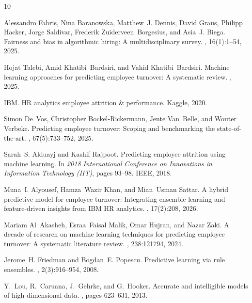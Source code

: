 \documentclass[twocolumn]{article}
\begin{document}
\begin{thebibliography}{10}

Alessandro Fabris, Nina Baranowska, Matthew~J. Dennis, David Graus, Philipp
  Hacker, Jorge Saldivar, Frederik Zuiderveen~Borgesius, and Asia~J. Biega.
\newblock Fairness and bias in algorithmic hiring: A multidisciplinary survey.
,
  16(1):1--54, 2025.

Hojat Talebi, Amid Khatibi~Bardsiri, and Vahid Khatibi~Bardsiri.
\newblock Machine learning approaches for predicting employee turnover: A
  systematic review.
, 2025.

{IBM}.
 {HR} analytics employee attrition \& performance.
\newblock Kaggle, 2020.

Simon De~Vos, Christopher Bockel-Rickermann, Jente Van~Belle, and Wouter
  Verbeke.
\newblock Predicting employee turnover: Scoping and benchmarking the
  state-of-the-art.
, 67(5):733--752,
  2025.

Sarah~S. Alduayj and Kashif Rajpoot.
\newblock Predicting employee attrition using machine learning.
\newblock In {\em 2018 International Conference on Innovations in Information
  Technology (IIT)}, pages 93--98. IEEE, 2018.

Muna~I. Alyousef, Hamza~Wazir Khan, and Mian~Usman Sattar.
\newblock A hybrid predictive model for employee turnover: Integrating ensemble
  learning and feature-driven insights from {IBM HR} analytics.
, 17(2):208, 2026.

Mariam Al~Akasheh, Esraa~Faisal Malik, Omar Hujran, and Nazar Zaki.
\newblock A decade of research on machine learning techniques for predicting
  employee turnover: A systematic literature review.
, 238:121794, 2024.

Jerome~H. Friedman and Bogdan~E. Popescu.
\newblock Predictive learning via rule ensembles.
, 2(3):916--954, 2008.

Y.~Lou, R.~Caruana, J.~Gehrke, and G.~Hooker.
\newblock Accurate and intelligible models of high-dimensional data.
, pages 623--631, 2013.


\end{thebibliography}
\end{document}
